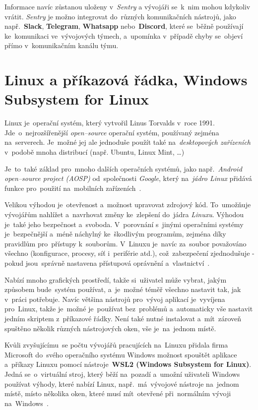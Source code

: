 \documentclass[11pt,a4paper]{report}
\newcommand{\acrdefprint}[3][full]{%
    \newacronym{#2}{#2}{#3}%
    \ifthenelse{\equal{#1}{short}}{%
        \textbf{\acrshort{#2}}%
    }{%
        \ifthenelse{\equal{#1}{long}}{%
            \textbf{\acrlong*{#2}}%
        }{%
            \textbf{\acrfull*{#2}}%
        }%
    }%
}
\let\oldacrshort\acrshort
\renewcommand{\acrshort}[1]{\emph{\normalsize\color[rgb]{0,0,0}\noindent\oldacrshort{#1}}}
\begin{document}
                Informace navíc zůstanou uloženy v~\emph{Sentry} a vývojáři se~k~nim mohou kdykoliv vrátit. \emph{Sentry} je možno integrovat do~různých komunikačních nástrojů, jako např.~\textbf{Slack}, \textbf{Telegram}, \textbf{Whatsapp} nebo~\textbf{Discord}, které se~běžně používají ke~komunikaci ve~vývojových týmech, a~upomínka v~případě chyby se~objeví přímo v~komunikačním kanálu týmu.

        \section{Linux a příkazová řádka, Windows Subsystem for Linux}
            Linux je~operační systém, který vytvořil Linus Torvalds v~roce 1991. Jde~o~nejrozšířenější \emph{open--source} operační systém, používaný zejména na~serverech. Je~možné jej ale jednoduše použít také na~\emph{desktopových zařízeních} v~podobě mnoha distribucí (např. Ubuntu, Linux Mint, \dots)
            
            Je~to~také základ pro~mnoho dalších operačních systémů, jako např.~\emph{Android open--source project (\emph{AOSP})} od~společnosti \emph{Google}, který na~\emph{jádro \acrdefprint[short]{OS}{Operační Systém} Linux} přidává funkce pro~použití na~mobilních zařízeních~\cite{AOSP:linux}.
            
            Velikou výhodou je~otevřenost a~možnost upravovat zdrojový kód. To~umožňuje vývojářům nahlížet a~navrhovat změny ke~zlepšení do~jádra \emph{Linuxu}. Výhodou je~také jeho bezpečnost a~svoboda. V~porovnání s~jinými operačními systémy je~bezpečnější a~méně náchylný ke~škodlivým programům, zejména díky pravidlům pro~přístupy k~souborům. V~Linuxu je~navíc za~soubor považováno všechno (konfigurace, procesy, síť i~periférie atd.), což~zabezpečení zjednodušuje - pokud jsou~správně nastavena přístupová oprávnění a~vlastnictví~\cite{medium:LinuxSecure}.

            Nabízí mnoho grafických prostředí, takže si~uživatel může vybrat, jakým způsobem bude~systém používat, a~je~možné téměř všechno nastavit tak, jak v~práci potřebuje. Navíc většina nástrojů pro~vývoj aplikací je~vyvíjena pro~Linux, takže je~možné je~používat bez~problémů a~automaticky vše nastavit jedním skriptem z~příkazové řádky. Není také nutné instalovat a~mít~zároveň spuštěno několik různých nástrojových oken, vše je~na~jednom místě.

            Kvůli zvyšujícímu~se počtu vývojářů pracujících na~Linuxu přidala firma Microsoft do~svého operačního systému Windows možnost spouštět aplikace a~příkazy Linuxu pomocí nástroje~\textbf{WSL2 (Windows Subsystem for Linux)}. Jedná se~o~virtuální stroj, který běží na~pozadí a~umožní uživateli Windows používat výhody, které nabízí Linux, např.~má~vývojové nástroje na~jednom místě, místo několika oken, které musí mít~otevřené při~normálním vývoji na~Windows~\cite{WSL2Winning2023}.
\end{document}
